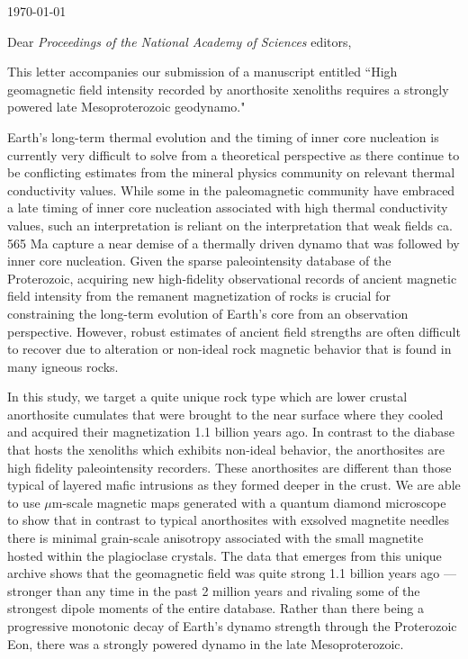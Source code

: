 \documentclass[11pt, letterpaper]{article}
\begin{document}
\begin{flushleft}
 
\hfill \today

Dear \textit{Proceedings of the National Academy of Sciences} editors,

This letter accompanies our submission of a manuscript entitled ``High geomagnetic field intensity recorded by anorthosite xenoliths requires a strongly powered late Mesoproterozoic geodynamo." 

Earth's long-term thermal evolution and the timing of inner core nucleation is currently very difficult to solve from a theoretical perspective as there continue to be conflicting estimates from the mineral physics community on relevant thermal conductivity values. While some in the paleomagnetic community have embraced a late timing of inner core nucleation associated with high thermal conductivity values, such an interpretation is reliant on the interpretation that weak fields ca. 565 Ma capture a near demise of a thermally driven dynamo that was followed by inner core nucleation. Given the sparse paleointensity database of the Proterozoic, acquiring new high-fidelity observational records of ancient magnetic field intensity from the remanent magnetization of rocks is crucial for constraining the long-term evolution of Earth's core from an observation perspective. However, robust estimates of ancient field strengths are often difficult to recover due to alteration or non-ideal rock magnetic behavior that is found in many igneous rocks. 

In this study, we target a quite unique rock type which are lower crustal anorthosite cumulates that were brought to the near surface where they cooled and acquired their magnetization 1.1 billion years ago. In contrast to the diabase that hosts the xenoliths which exhibits non-ideal behavior, the anorthosites are high fidelity paleointensity recorders. These anorthosites are different than those typical of layered mafic intrusions as they formed deeper in the crust. We are able to use $\mu$m-scale magnetic maps generated with a quantum diamond microscope to show that in contrast to typical anorthosites with exsolved magnetite needles there is minimal grain-scale anisotropy associated with the small magnetite hosted within the plagioclase crystals. The data that emerges from this unique archive shows that the geomagnetic field was quite strong 1.1 billion years ago --- stronger than any time in the past 2 million years and rivaling some of the strongest dipole moments of the entire database. Rather than there being a progressive monotonic decay of Earth's dynamo strength through the Proterozoic Eon, there was a strongly powered dynamo in the late Mesoproterozoic.


\end{flushleft}
\end{document}
